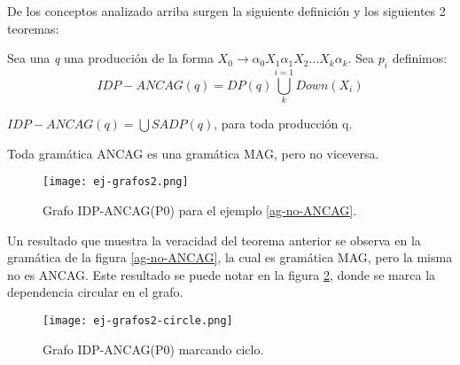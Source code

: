 De los conceptos analizado arriba surgen la siguiente definición y los siguientes 2 teoremas:

\begin{definition}
 Sea una \textit{q} una producción de la forma $X_{0}\rightarrow \alpha_{0} X_{1} \alpha_{1} X_{2} \dots X_{k} \alpha_{k}$. Sea $p_{i}$ definimos:
\begin{equation}
 IDP-ANCAG(q) = DP(q) \bigcup\limits_{k}^{i=1}{Down(X_{i})}
\end{equation}

\end{definition}

\begin{theorem}
$IDP-ANCAG(q) = \bigcup SADP(q)$, para toda producción q. 
\end{theorem}

\begin{theorem}
Toda gramática ANCAG es una gramática MAG, pero no viceversa.
\end{theorem}

\begin{figure}\centering
 \texttt{[image: ej-grafos2.png]}
\caption{\label{idp-wuu-yang}Grafo IDP-ANCAG(P0) para el ejemplo \ref{ag-no-ANCAG}.}
\end{figure}

Un resultado que muestra la veracidad del teorema anterior se observa en la gramática de la figura \ref{ag-no-ANCAG}, la cual es gramática MAG, pero la misma no es ANCAG. Este resultado se puede notar en la figura \ref{ancag-circle}, donde se marca la dependencia circular en el grafo.
\begin{figure}\centering
 \texttt{[image: ej-grafos2-circle.png]}
\caption{\label{ancag-circle} Grafo IDP-ANCAG(P0) marcando ciclo.}
\end{figure}